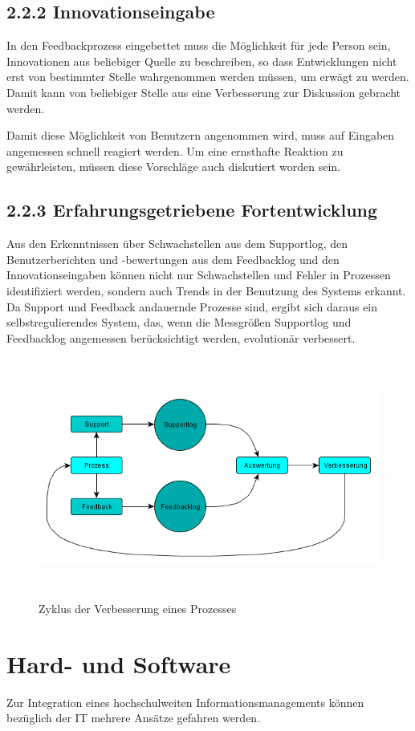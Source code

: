 \documentclass[a4paper]{article}
\begin{document}
\subsection{2.2.2 Innovationseingabe}
{\sffamily
In den Feedbackprozess eingebettet muss die Möglichkeit für jede Person sein, Innovationen aus beliebiger Quelle zu
beschreiben, so dass Entwicklungen nicht erst von bestimmter Stelle wahrgenommen werden müssen, um erwägt zu werden.
Damit kann von beliebiger Stelle aus eine Verbesserung zur Diskussion gebracht werden.}

{\sffamily
Damit diese Möglichkeit von Benutzern angenommen wird, muss auf Eingaben angemessen schnell reagiert werden. Um eine
ernsthafte Reaktion zu gewährleisten, müssen diese Vorschläge auch diskutiert worden sein.}

\subsection[2.2.3 Erfahrungsgetriebene Fortentwicklung]{2.2.3 Erfahrungsgetriebene Fortentwicklung}
{\sffamily
Aus den Erkenntnissen über Schwachstellen aus dem Supportlog, den Benutzerberichten und -bewertungen aus dem Feedbacklog
und den Innovationseingaben können nicht nur Schwachstellen und Fehler in Prozessen identifiziert werden, sondern auch
Trends in der Benutzung des Systems erkannt. Da Support und Feedback andauernde Prozesse sind, ergibt sich daraus ein
selbstregulierendes System, das, wenn die Messgrößen Supportlog und Feedbacklog angemessen berücksichtigt werden,
evolutionär verbessert.}



\begin{figure}
\centering
\includegraphics[width=15.501cm,height=7.913cm]{VorlaufigeSollSituationeblingsprafkeluebke-img/VorlaufigeSollSituationeblingsprafkeluebke-img003.png}
\caption[Zyklus der Verbesserung eines Prozesses]{Zyklus der Verbesserung eines Prozesses}

\end{figure}
\clearpage\section{Hard- und Software}
{\sffamily
Zur Integration eines hochschulweiten Informationsmanagements können bezüglich der IT mehrere Ansätze gefahren werden.}
\end{document}
